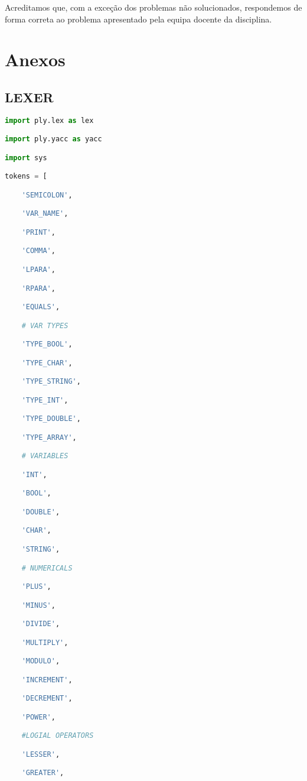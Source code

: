 \documentclass[11pt,a4paper]{report}
\begin{document}
    Acreditamos que, com a exceção dos problemas não solucionados, respondemos de forma correta ao problema apresentado pela equipa docente da disciplina.
	
\pagebreak

    \chapter{Anexos}
    \section{LEXER}
    \begin{lstlisting}[language=python,firstnumber=1]
    import ply.lex as lex

import ply.yacc as yacc

import sys

tokens = [

	'SEMICOLON',

	'VAR_NAME',

	'PRINT',

	'COMMA',

	'LPARA',

	'RPARA',

	'EQUALS',

	# VAR TYPES

	'TYPE_BOOL',

	'TYPE_CHAR',

	'TYPE_STRING',

	'TYPE_INT',

	'TYPE_DOUBLE',

	'TYPE_ARRAY',

	# VARIABLES

	'INT',

	'BOOL',

	'DOUBLE',

	'CHAR',

	'STRING',

	# NUMERICALS

	'PLUS',

	'MINUS',

	'DIVIDE',

	'MULTIPLY',

	'MODULO',

	'INCREMENT',

	'DECREMENT',

	'POWER',

	#LOGIAL OPERATORS

	'LESSER',

	'GREATER',


\end{lstlisting}
\end{document}
